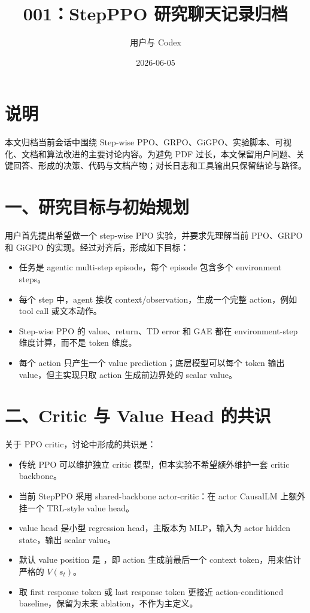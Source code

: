 \documentclass[10pt]{ctexart}
\title{001：StepPPO 研究聊天记录归档}
\author{用户与 Codex}
\date{2026-06-05}
\begin{document}
\maketitle
\vspace{-1.2em}

\section*{说明}
本文归档当前会话中围绕 Step-wise PPO、GRPO、GiGPO、实验脚本、可视化、文档和算法改进的主要讨论内容。为避免 PDF 过长，本文保留用户问题、关键回答、形成的决策、代码与文档产物；对长日志和工具输出只保留结论与路径。

\section*{一、研究目标与初始规划}
用户首先提出希望做一个 step-wise PPO 实验，并要求先理解当前 PPO、GRPO 和 GiGPO 的实现。经过对齐后，形成如下目标：
\begin{itemize}
\item 任务是 agentic multi-step episode，每个 episode 包含多个 environment steps。
\item 每个 step 中，agent 接收 context/observation，生成一个完整 action，例如 tool call 或文本动作。
\item Step-wise PPO 的 value、return、TD error 和 GAE 都在 environment-step 维度计算，而不是 token 维度。
\item 每个 action 只产生一个 value prediction；底层模型可以每个 token 输出 value，但主实现只取 action 生成前边界处的 scalar value。
\end{itemize}

\section*{二、Critic 与 Value Head 的共识}
关于 PPO critic，讨论中形成的共识是：
\begin{itemize}
\item 传统 PPO 可以维护独立 critic 模型，但本实验不希望额外维护一套 critic backbone。
\item 当前 StepPPO 采用 shared-backbone actor-critic：在 actor CausalLM 上额外挂一个 TRL-style value head。
\item value head 是小型 regression head，主版本为 MLP，输入为 actor hidden state，输出 scalar value。
\item 默认 value position 是 ，即 action 生成前最后一个 context token，用来估计严格的 $V(s_t)$。
\item 取 first response token 或 last response token 更接近 action-conditioned baseline，保留为未来 ablation，不作为主定义。
\end{itemize}
\end{document}
